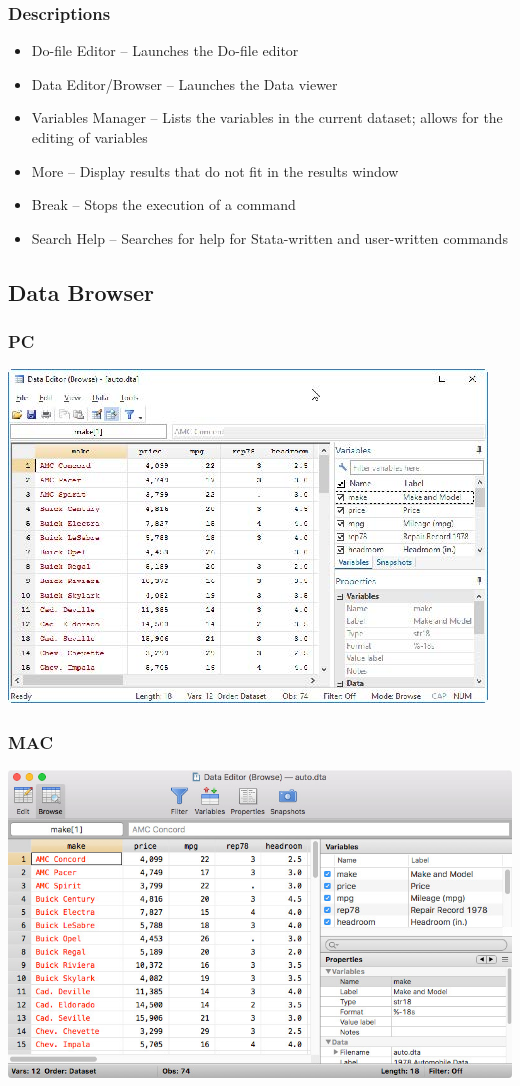 \documentclass{beamer}
\begin{document}
\begin{frame}
	\frametitle{Descriptions}
		\begin{itemize}
			\item Do-file Editor -- Launches the Do-file editor
			\item Data Editor/Browser -- Launches the Data viewer
			\item Variables Manager -- Lists the variables in the current dataset; allows for the editing of variables
			\item More -- Display results that do not fit in the results window
			\item Break -- Stops the execution of a command
			\item Search Help -- Searches for help for Stata-written and user-written commands
		\end{itemize}
\end{frame}

\subsection{Data Browser}

\begin{frame}
	\frametitle{PC}
		\includegraphics[scale=0.75]{data_editor_pc}
\end{frame}

\begin{frame}
	\frametitle{MAC}
		\includegraphics[scale=0.35]{data_editor_mac}
\end{frame}
\end{document}
